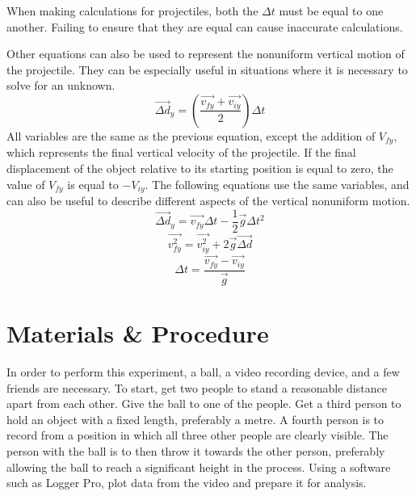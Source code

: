 \documentclass[10pt,twocolumn,letterpaper]{article}
\begin{document}
When making calculations for projectiles, both the \(\Delta t\) must be equal to one another. Failing to ensure that they are equal can cause inaccurate calculations.

Other equations can also be used to represent the nonuniform vertical motion of the projectile. They can be especially useful in situations where it is necessary to solve for an unknown.
\begin{equation}
    \overrightarrow{\Delta d}_{y}=(\frac{\overrightarrow{v_{fy}}+\overrightarrow{v_{iy}}}{2})\Delta t
\end{equation}
All variables are the same as the previous equation, except the addition of \(V_{fy}\), which represents the final vertical velocity of the projectile. If the final displacement of the object relative to its starting position is equal to zero, the value of \(V_{fy}\) is equal to \(-V_{iy}\).
The following equations use the same variables, and can also be useful to describe different aspects of the vertical nonuniform motion.
\begin{equation}
    \overrightarrow{\Delta d}_{y}=\overrightarrow{v_{fy}}\Delta t-\frac{1}{2}\overrightarrow{g}\Delta t^2
\end{equation}
\begin{equation}
    \overrightarrow{v_{fy}^2}=\overrightarrow{v_{iy}^2}+2\overrightarrow{g} \overrightarrow{\Delta d}
\end{equation}
\begin{equation}
    \Delta t=\frac{\overrightarrow{v_{fy}}-\overrightarrow{v_{iy}}}{\overrightarrow{g}}
\end{equation}


\section{Materials \& Procedure}

In order to perform this experiment, a ball, a video recording device, and a few friends are necessary. To start, get two people to stand a reasonable distance apart from each other. Give the ball to one of the people. Get a third person to hold an object with a fixed length, preferably a metre. A fourth person is to record from a position in which all three other people are clearly visible. The person with the ball is to then throw it towards the other person, preferably allowing the ball to reach a significant height in the process. Using a software such as Logger Pro, plot data from the video and prepare it for analysis. 
\end{document}
